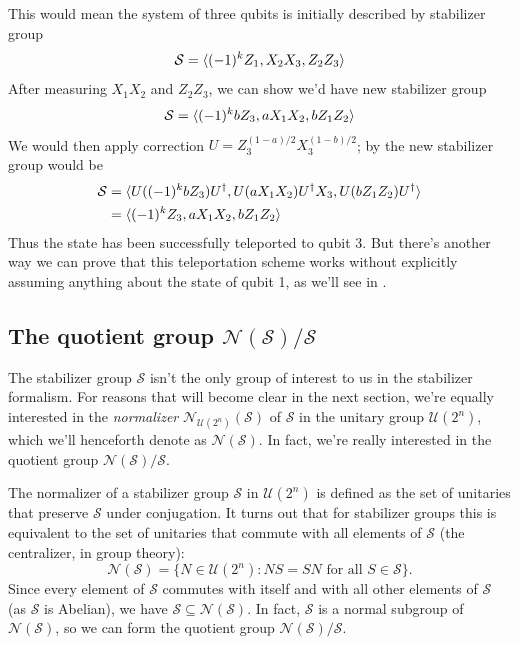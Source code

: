 \begin{example}
    This would mean the system of three qubits is initially described by stabilizer group
    \begin{equation}
        \mathcal{S} = \langle (-1)^k Z_1, X_2 X_3, Z_2 Z_3 \rangle
    \end{equation}
    After measuring $X_1 X_2$ and $Z_2 Z_3$, we can show we'd have new stabilizer group
    \begin{equation}
        \mathcal{S} = \langle (-1)^k b Z_3, a X_1 X_2, b Z_1 Z_2 \rangle
    \end{equation}
    We would then apply correction $U = Z_3^{(1 - a)/2} X_3^{(1 - b)/2}$; by  the new stabilizer group would be
    \begin{equation}
        \begin{aligned}
            \mathcal{S}
            &= \langle U ((-1)^k b Z_3) U^\dagger, U (a X_1 X_2) U^\dagger X_3, U (b Z_1 Z_2) U^\dagger \rangle \\
            &= \langle (-1)^k Z_3, a X_1 X_2, b Z_1 Z_2 \rangle
        \end{aligned}
    \end{equation}
    Thus the state has been successfully teleported to qubit 3.
    But there's another way we can prove that this teleportation scheme works without explicitly assuming anything about the state of qubit 1, as we'll see in .
\end{example}

\subsection{The quotient group $\mathcal{N}(\mathcal{S})/\mathcal{S}$}

The stabilizer group $\mathcal{S}$ isn't the only group of interest to us in the stabilizer formalism.
For reasons that will become clear in the next section, we're equally interested in the \emph{normalizer} $\mathcal{N}_{\mathcal{U}(2^n)}(\mathcal{S})$ of $\mathcal{S}$ in the unitary group $\mathcal{U}(2^n)$, which we'll henceforth denote as $\mathcal{N}(\mathcal{S})$.
In fact, we're really interested in the quotient group $\mathcal{N}(\mathcal{S})/\mathcal{S}$.

The normalizer of a stabilizer group $\mathcal{S}$ in $\mathcal{U}(2^n)$ is defined as the set of unitaries that preserve $\mathcal{S}$ under conjugation.
It turns out that for stabilizer groups this is equivalent to the set of unitaries that commute with all elements of $\mathcal{S}$ (the centralizer, in group theory):
\begin{equation}
    \mathcal{N}(\mathcal{S}) = \{ N \in \mathcal{U}(2^n) : NS = SN \text{ for all } S \in \mathcal{S} \}.
\end{equation}
Since every element of $\mathcal{S}$ commutes with itself and with all other elements of $\mathcal{S}$ (as $\mathcal{S}$ is Abelian), we have $\mathcal{S} \subseteq \mathcal{N}(\mathcal{S})$.
In fact, $\mathcal{S}$ is a normal subgroup of $\mathcal{N}(\mathcal{S})$, so we can form the quotient group $\mathcal{N}(\mathcal{S})/\mathcal{S}$.

